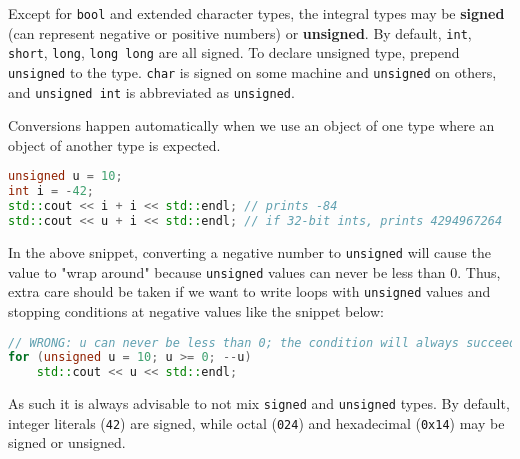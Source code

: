 Except for \texttt{bool} and extended character types, the integral types may be \textbf{signed} (can represent negative or positive numbers) or \textbf{unsigned}. By default, \texttt{int}, \texttt{short}, \texttt{long}, \texttt{long long} are all signed. To declare unsigned type, prepend \texttt{unsigned} to the type. \texttt{char} is signed on some machine and \texttt{unsigned} on others, and \texttt{unsigned int} is abbreviated as \texttt{unsigned}.

Conversions happen automatically when we use an object of one type where an object of another type is expected. 
\begin{lstlisting}[language=c++]
unsigned u = 10; 
int i = -42; 
std::cout << i + i << std::endl; // prints -84 
std::cout << u + i << std::endl; // if 32-bit ints, prints 4294967264
\end{lstlisting}
In the above snippet, converting a negative number to \texttt{unsigned} will cause the value to "wrap around" because \texttt{unsigned} values can never be less than $0$. Thus, extra care should be taken if we want to write loops with \texttt{unsigned} values and stopping conditions at negative values like the snippet below:
\begin{lstlisting}[language=c++]
// WRONG: u can never be less than 0; the condition will always succeed 
for (unsigned u = 10; u >= 0; --u) 
    std::cout << u << std::endl;
\end{lstlisting}

As such it is always advisable to not mix \texttt{signed} and \texttt{unsigned} types. By default, integer literals (\texttt{42}) are signed, while octal (\texttt{024}) and hexadecimal (\texttt{0x14}) may be signed or unsigned.



